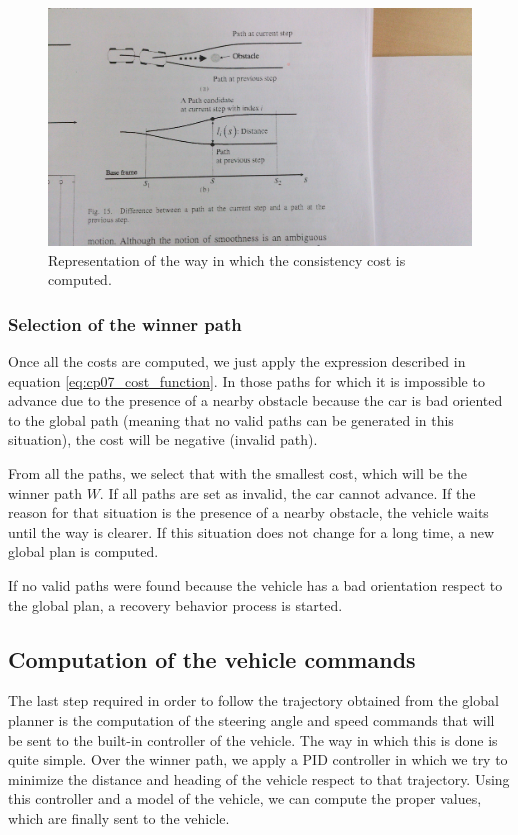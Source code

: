 \begin{figure}[h!]
  \centering
  \includegraphics[width=\textwidth]{consistency_cost}
  \caption{Representation of the way in which the consistency cost is computed.}\label{fig:cp07_consistency_cost}
\end{figure}

\subsubsection{Selection of the winner path}\label{ch:chapter07_01_04_01}

Once all the costs are computed, we just apply the expression described in equation \ref{eq:cp07_cost_function}. In those paths for which it is impossible to advance due to the presence of a nearby obstacle because the car is bad oriented to the global path (meaning that no valid paths can be generated in this situation), the cost will be negative (invalid path).

From all the paths, we select that with the smallest cost, which will be the winner path $W$. If all paths are set as invalid, the car cannot advance. If the reason for that situation is the presence of a nearby obstacle, the vehicle waits until the way is clearer. If this situation does not change for a long time, a new global plan is computed.

If no valid paths were found because the vehicle has a bad orientation respect to the global plan, a recovery behavior process is started.

\subsection{Computation of the vehicle commands}\label{ch:chapter07_01_04}

The last step required in order to follow the trajectory obtained from the global planner is the computation of the steering angle and speed commands that will be sent to the built-in controller of the vehicle. The way in which this is done is quite simple. Over the winner path, we apply a \ac{PID} controller in which we try to minimize the distance and heading of the vehicle respect to that trajectory. Using this controller and a model of the vehicle, we can compute the proper values, which are finally sent to the vehicle.

